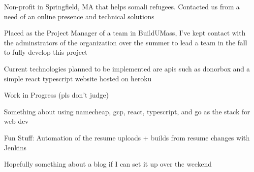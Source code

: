 \begin{tightemize}
    \item Non-profit in Springfield, MA that helps somali refugees. Contacted us from a need of an online presence and technical solutions
    \item Placed as the Project Manager of a team in BuildUMass, I've kept contact with the adminstrators of the organization over the summer to lead a team in the fall to fully develop this project
    \item Current technologies planned to be implemented are apis such as donorbox and a simple react typescript website hosted on heroku
\end{tightemize}
\sectionsep

\begin{tightemize}
    \item Work in Progress (pls don't judge)
    \item Something about using namecheap, gcp, react, typescript, and go as the stack for web dev
    \item Fun Stuff: Automation of the resume uploads + builds from resume changes with Jenkins
    \item Hopefully something about a blog if I can set it up over the weekend
\end{tightemize}


